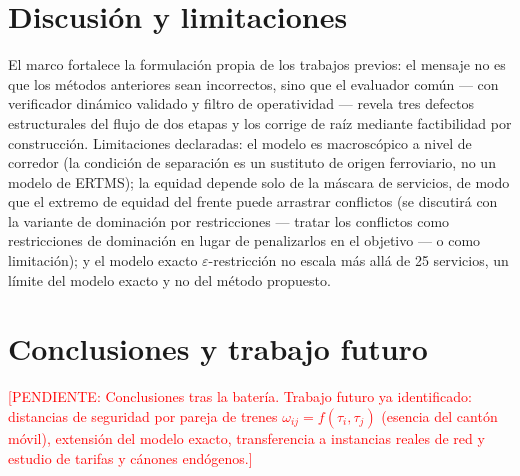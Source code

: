 \documentclass[11pt,a4paper]{article}
\newcommand{\pendiente}[1]{\textcolor{red}{[PENDIENTE: #1]}}
\begin{document}
\section{Discusión y limitaciones}
\label{sec:discusion}

El marco fortalece la formulación propia de los trabajos previos: el mensaje
no es que los métodos anteriores sean incorrectos, sino que el evaluador
común --- con verificador dinámico validado y filtro de operatividad ---
revela tres defectos estructurales del flujo de dos etapas y los corrige de
raíz mediante factibilidad por construcción. Limitaciones declaradas: el
modelo es macroscópico a nivel de corredor (la condición de separación es un
sustituto de origen ferroviario, no un modelo de ERTMS); la equidad depende
solo de la máscara de servicios, de modo que el extremo de equidad del
frente puede arrastrar conflictos (se discutirá con la variante de
dominación por restricciones --- tratar los conflictos como restricciones
de dominación en lugar de penalizarlos en el objetivo --- o como
limitación); y el modelo exacto $\varepsilon$-restricción no escala más
allá de 25 servicios, un límite del modelo exacto y no del método propuesto.

\section{Conclusiones y trabajo futuro}
\label{sec:conclusiones}

\pendiente{Conclusiones tras la batería. Trabajo futuro ya identificado:
distancias de seguridad por pareja de trenes $\omega_{ij} = f(\tau_i,
\tau_j)$ (esencia del cantón móvil), extensión del modelo exacto,
transferencia a instancias reales de red y estudio de tarifas y cánones
endógenos.}
\end{document}
